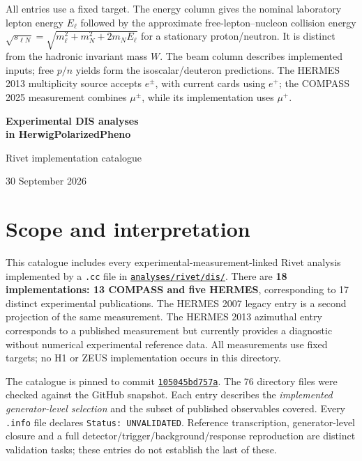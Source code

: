 \documentclass[11pt,a4paper]{article}
\begin{document}
\begin{landscape}
All entries use a fixed target. The energy column gives the nominal laboratory
lepton energy $E_\ell$ followed by the approximate free-lepton--nucleon collision
energy $\sqrt{s_{\ell N}}=\sqrt{m_\ell^2+m_N^2+2m_NE_\ell}$ for a stationary
proton/neutron. It is distinct from the hadronic invariant mass $W$.
The beam column describes implemented inputs; free $p/n$ yields form the
isoscalar/deuteron predictions. The HERMES 2013 multiplicity source accepts
$e^\pm$, with current cards using $e^+$; the COMPASS 2025 measurement combines
$\mu^\pm$, while its implementation uses $\mu^+$.
\endgroup
\vfill
\begin{center}\thepage\end{center}
\end{landscape}
\begin{center}
{\LARGE\bfseries Experimental DIS analyses\\[3pt] in HerwigPolarizedPheno\par}
\vspace{5pt}
{\large Rivet implementation catalogue\par}
30 September 2026
\end{center}

\section{Scope and interpretation}
This catalogue includes every experimental-measurement-linked Rivet analysis
implemented by a \texttt{.cc} file in
\href{https://github.com/apapaefs/HerwigPolarizedPheno/tree/105045bd757aaa6b217e87811dc5f9a22a8d1cef/analyses/rivet/dis}{\texttt{analyses/rivet/dis/}}.
There are \textbf{18 implementations: 13 COMPASS and five HERMES}, corresponding
to 17 distinct experimental publications. The HERMES 2007 legacy entry is a
second projection of the same measurement. The HERMES 2013 azimuthal entry
corresponds to a published measurement but currently provides a diagnostic
without numerical experimental reference data. All measurements use fixed
targets; no H1 or ZEUS implementation occurs in this directory.

The catalogue is pinned to commit
\href{https://github.com/apapaefs/HerwigPolarizedPheno/commit/105045bd757aaa6b217e87811dc5f9a22a8d1cef}{\texttt{105045bd757a}}.
The 76 directory files were checked against the GitHub snapshot.
Each entry describes the \emph{implemented generator-level selection} and
the subset of published observables covered. Every \texttt{.info} file declares
\texttt{Status: UNVALIDATED}. Reference transcription, generator-level closure
and a full detector/trigger/background/response reproduction are distinct
validation tasks; these entries do not establish the last of these.
\end{document}
